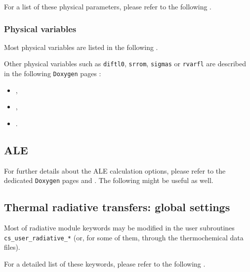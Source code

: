 For a list of these physical parameters, please refer to the following
.

\subsubsection{Physical variables}

Most physical variables are listed in the following
.

Other physical variables such as \texttt{diftl0}, \texttt{srrom},
\texttt{sigmas} or \texttt{rvarfl} are described in the following
\texttt{Doxygen} pages :
\begin{itemize}
\item {},
\item {},
\item {}.
\end{itemize}

\subsection{ALE}

For further details about the ALE calculation options,
please refer to the dedicated \texttt{Doxygen} pages
 and
. The following
 might be useful as well.

\subsection{Thermal radiative transfers: global settings}

Most of radiative module keywords may be modified in the user subroutines
\texttt{cs\_user\_radiative\_*} (or, for some of them, through the
thermochemical data files).

For a detailed list of these keywords, please refer to the following
.

